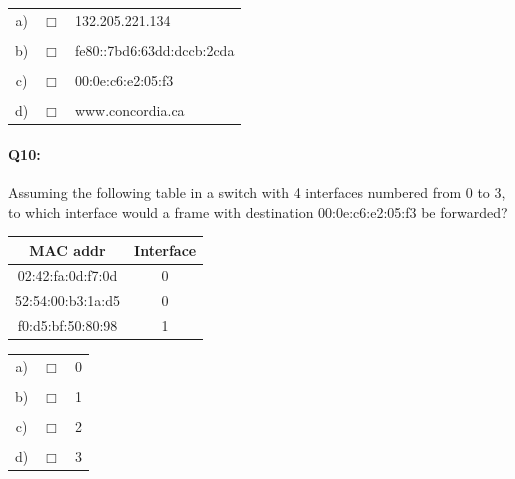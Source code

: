 \documentclass{llncs}
\begin{document}
\begin{tabular}{ccl}
  a) & $\Box$ & 132.205.221.134\\
  \\
  b) & $\Box$ & fe80::7bd6:63dd:dccb:2cda\\
  \\
  c) & $\Box$ & 00:0e:c6:e2:05:f3\\
  \\
  d) & $\Box$ & www.concordia.ca\\
\end{tabular}

\vfill
\paragraph{\textbf{Q10:}}
Assuming the following table in a switch with 4 interfaces numbered
from 0 to 3, to which interface would a frame with destination
00:0e:c6:e2:05:f3 be forwarded?

\vspace*{0.3cm}
\begin{center}
\begin{tabular}{c|c}
  MAC addr & Interface \\
  \hline
  02:42:fa:0d:f7:0d & 0 \\
  52:54:00:b3:1a:d5 & 0 \\
  f0:d5:bf:50:80:98 & 1 \\
\end{tabular}
\vspace*{0.3cm}
\end{center}

\begin{tabular}{ccl}
  a) & $\Box$ & 0\\
  \\
  b) & $\Box$ & 1\\
  \\
  c) & $\Box$ & 2\\
  \\
  d) & $\Box$ & 3\\
\end{tabular}
\vfill
\end{document}
